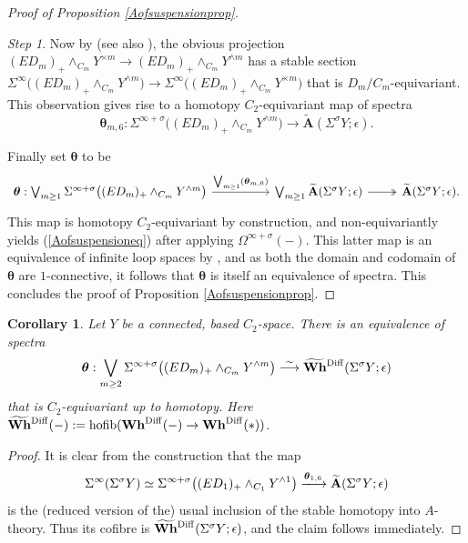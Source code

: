 \documentclass[a4paper, oneside]{amsart}
\newcommand{\diff}{\mathrm{Diff}}
\newcommand{\hofib}{\operatorname{hofib}}
\newcommand{\1}{\mathds{1}}
\newtheorem{cor}[thm]{Corollary}
\theoremstyle{remark}
\newtheorem{step}{Step}
\theoremstyle{definition}
\newcommand{\geqs}{\scaleobj{0.85}{\geq}}
\newcommand{\Asp}{\mathbf{A}}
\newcommand{\bWhsp}{\widetilde{\mathbf{Wh}}{\vphantom{\mathrm{Wh}}}^{\diff}}
\newcommand{\Whsp}{\mathbf{Wh}^{\diff}}
\numberwithin{equation}{section}
\begin{document}
\begin{proof}[Proof of Proposition \ref{Aofsuspensionprop}]
\begin{step}
    Now by \cite[Lem. 1.4]{Atheorysuspension} (see also \cite[Lem. 2.4]{CohenCarlssonTCFLS}), the obvious projection $(ED_m)_+\wedge_{C_m} Y^{\times m}\to (ED_m)_+\wedge_{C_m} Y^{\wedge m}$ has a stable section $\Sigma^\infty\big((ED_m)_+\wedge_{C_m} Y^{\wedge m}\big)\to \Sigma^\infty\big((ED_m)_+\wedge_{C_m} Y^{\times m}\big)$ that is $D_m/C_m$-equivariant. This observation gives rise to a homotopy $C_2$-equivariant map of spectra
$$
\boldsymbol{\theta}_{m,6}: \Sigma^{\infty+\sigma}\big ((ED_m)_+\wedge_{C_m} Y^{\wedge m}\big )\longrightarrow \widetilde{\Asp}(\Sigma^\sigma Y;\epsilon).
    $$
\end{step}
     Finally set $\boldsymbol{\theta}$ to be 
    $$
    \begin{tikzcd}
\boldsymbol{\theta}: \bigvee_{m\geq 1} \Sigma^{\infty+\sigma}\big((ED_m)_+\wedge_{C_m} Y^{\wedge m}\big)\ar[rr,"\bigvee_{m\geqs 1}(\boldsymbol{\theta}_{m,6})"] && \bigvee_{m\geq 1}  \widetilde{\Asp}(\Sigma^\sigma Y;\epsilon)\rar[two heads] & \widetilde{\Asp}(\Sigma^\sigma Y;\epsilon).
\end{tikzcd}
    $$
    This map is homotopy $C_2$-equivariant by construction, and non-equivariantly yields (\ref{Aofsuspensioneq}) after applying $\Omega^{\infty+\sigma}(-)$. This latter map is an equivalence of infinite loop spaces by \cite[Thm. 1.6]{Atheorysuspension}, and as both the domain and codomain of $\boldsymbol{\theta}$ are $1$-connective, it follows that $\boldsymbol{\theta}$ is itself an equivalence of spectra. This concludes the proof of Proposition \ref{Aofsuspensionprop}. 
\end{proof}


\begin{cor}\label{Whofsuspension}
    Let $Y$ be a connected, based $C_2$-space. There is an equivalence of spectra
    $$
\boldsymbol{\theta}: \bigvee_{m\geq 2}\Sigma^{\infty+\sigma}\big((ED_m)_+\wedge_{C_m}Y^{\wedge m}\big)\overset{\sim}\longrightarrow \bWhsp(\Sigma^\sigma Y;\epsilon)
    $$
    that is $C_2$-equivariant up to homotopy. Here $\bWhsp(-):=\hofib(\Whsp(-)\to \Whsp(*))$.
\end{cor}

\begin{proof}
    It is clear from the construction that the map 
    $$
\Sigma^\infty(\Sigma^\sigma Y)\simeq\Sigma^{\infty+\sigma}\big((ED_1)_+\wedge_{C_1}Y^{\wedge 1}\big)\xlongrightarrow{\boldsymbol{\theta}_{1,6}} \widetilde{\Asp}(\Sigma^\sigma Y;\epsilon)
    $$
    is the (reduced version of the) usual inclusion of the stable homotopy into $A$-theory. Thus its cofibre is $\bWhsp(\Sigma^\sigma Y;\epsilon)$, and the claim follows immediately.
\end{proof}
\end{document}
